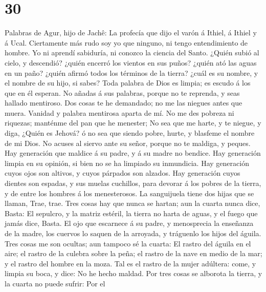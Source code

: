 \hypertarget{section-29}{%
\section{30}\label{section-29}}

 Palabras de Agur, hijo de Jachê: La profecía que dijo el
varón á Ithiel, á Ithiel y á Ucal.  Ciertamente más rudo
soy yo que ninguno, ni tengo entendimiento de hombre.  Yo
ni aprendí sabiduría, ni conozco la ciencia del Santo. 
¿Quién subió al cielo, y descendió? ¿quién encerró los vientos en sus
puños? ¿quién ató las aguas en un paño? ¿quién afirmó todos los términos
de la tierra? ¿cuál es su nombre, y el nombre de su hijo, si sabes?
 Toda palabra de Dios es limpia; es escudo á los que en él
esperan.  No añadas á sus palabras, porque no te reprenda,
y seas hallado mentiroso.  Dos cosas te he demandado; no
me las niegues antes que muera.  Vanidad y palabra
mentirosa aparta de mí. No me des pobreza ni riquezas; manténme del pan
que he menester;  No sea que me harte, y te niegue, y
diga, ¿Quién es Jehová? ó no sea que siendo pobre, hurte, y blasfeme el
nombre de mi Dios.  No acuses al siervo ante su señor,
porque no te maldiga, y peques.  Hay generación que
maldice á su padre, y á su madre no bendice.  Hay
generación limpia en su opinión, si bien no se ha limpiado su
inmundicia.  Hay generación cuyos ojos son altivos, y
cuyos párpados son alzados.  Hay generación cuyos dientes
son espadas, y sus muelas cuchillos, para devorar á los pobres de la
tierra, y de entre los hombres á los menesterosos.  La
sanguijuela tiene dos hijas que se llaman, Trae, trae. Tres cosas hay
que nunca se hartan; aun la cuarta nunca dice, Basta:  El
sepulcro, y la matriz estéril, la tierra no harta de aguas, y el fuego
que jamás dice, Basta.  El ojo que escarnece á su padre,
y menosprecia la enseñanza de la madre, los cuervos lo saquen de la
arroyada, y tráguenlo los hijos del águila.  Tres cosas
me son ocultas; aun tampoco sé la cuarta:  El rastro del
águila en el aire; el rastro de la culebra sobre la peña; el rastro de
la nave en medio de la mar; y el rastro del hombre en la moza.
 Tal es el rastro de la mujer adúltera: come, y limpia su
boca, y dice: No he hecho maldad.  Por tres cosas se
alborota la tierra, y la cuarta no puede sufrir:  Por el
